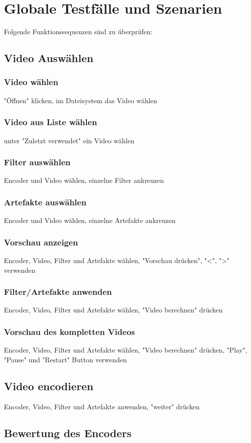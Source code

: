 \documentclass[parskip=full]{scrartcl}
\begin{document}
\section{Globale Testfälle und Szenarien}
Folgende Funktionssequenzen sind zu überprüfen:
\subsection{Video Auswählen}
\subsubsection{Video wählen}
"Öffnen" klicken, im Dateisystem das Video wählen
\subsubsection{Video aus Liste wählen}
unter "Zuletzt verwendet" ein Video wählen
\subsubsection{Filter auswählen}
Encoder und Video wählen, einzelne Filter ankreuzen
\subsubsection{Artefakte auswählen}
Encoder und Video wählen, einzelne Artefakte ankreuzen
\subsubsection{Vorschau anzeigen}
Encoder, Video, Filter und Artefakte wählen, "Vorschau drücken", "<", ">" verwenden
\subsubsection{Filter/Artefakte anwenden}
Encoder, Video, Filter und Artefakte wählen, "Video berechnen" drücken
\subsubsection{Vorschau des kompletten Videos}
Encoder, Video, Filter und Artefakte wählen, "Video berechnen" drücken, "Play", "Pause" und "Restart" Button verwenden
\subsection{Video encodieren}
Encoder, Video, Filter und Artefakte anwenden, "weiter" drücken
\subsection{Bewertung des Encoders}
\end{document}
